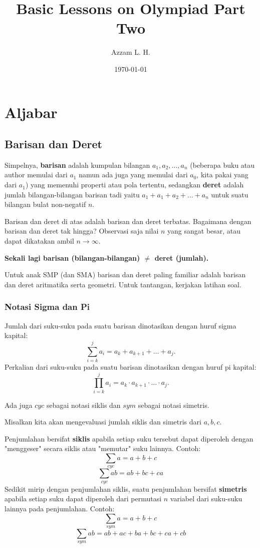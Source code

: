 \documentclass[11pt]{scrartcl}
\begin{document}
	\title{Basic Lessons on Olympiad Part Two} %
	\date{\today}
	\author{Azzam L. H.}
	\maketitle
    
    \section{Aljabar}
    \subsection{Barisan dan Deret}
    Simpelnya, \textbf{barisan} adalah kumpulan bilangan $a_1,a_2,\dots,a_n$ (beberapa buku atau author memulai dari $a_1$ namun ada juga yang memulai dari $a_0$, kita pakai yang dari $a_1$) yang memenuhi properti atau pola tertentu, sedangkan \textbf{deret} adalah jumlah bilangan-bilangan barisan tadi yaitu $a_1+a_1+a_2+\dots+a_n$ untuk suatu bilangan bulat non-negatif $n$.
    
    Barisan dan deret di atas adalah barisan dan deret terbatas. Bagaimana dengan barisan dan deret tak hingga? Observasi saja nilai $n$ yang sangat besar, atau dapat dikatakan ambil $n \rightarrow \infty.$
    
    \textbf{Sekali lagi barisan (bilangan-bilangan) $\neq$ deret (jumlah).}
    
    Untuk anak SMP (dan SMA) barisan dan deret paling familiar adalah barisan dan deret aritmatika serta geometri. Untuk tantangan, kerjakan latihan soal.
    
    \subsubsection{Notasi Sigma dan Pi}
    Jumlah dari suku-suku pada suatu barisan dinotasikan dengan huruf sigma kapital:
    $$\sum_{i=k}^{j} a_i = a_k+a_{k+1}+\dots+a_j.$$
    Perkalian dari suku-suku pada suatu barisan dinotasikan dengan huruf pi kapital:
    $$\prod_{i=k}^{j} a_i = a_k \cdot a_{k+1}\cdot \ldots \cdot a_j.$$
    
    Ada juga $cyc$ sebagai notasi siklis dan $sym$ sebagai notasi simetris.
    
    Misalkan kita akan mengevaluasi jumlah siklis dan simetris dari $a,b,c$.
    
    Penjumlahan bersifat \textbf{siklis} apabila setiap suku tersebut dapat diperoleh dengan "menggeser" secara siklis atau "memutar" suku lainnya.
    Contoh: $$\sum_{cyc} a = a+b+c$$
         $$\sum_{cyc} ab = ab+ bc + ca$$
    Sedikit mirip dengan penjumlahan siklis, suatu penjumlahan bersifat \textbf{simetris} apabila setiap suku dapat diperoleh dari permutasi $n$ variabel dari suku-suku lainnya pada penjumlahan. Contoh: 
        $$\sum_{sym} a = a+b+c$$
        $$\sum_{sym} ab = ab+ ac + ba + bc + ca + cb$$
    
\end{document}

